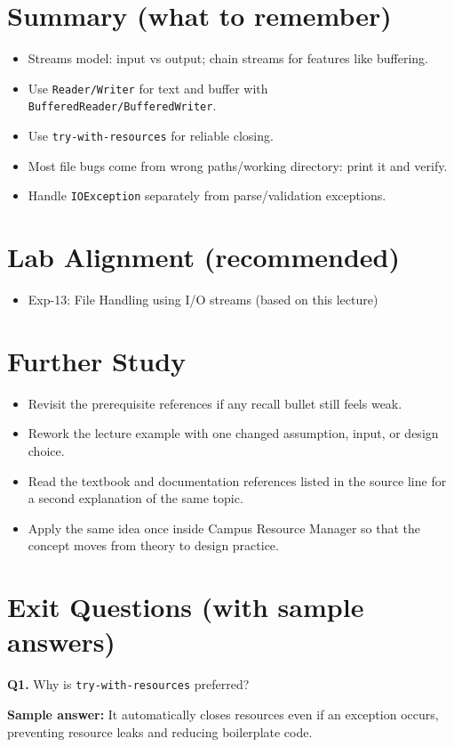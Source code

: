 \documentclass[11pt]{article}
\begin{document}
\section{Summary (what to remember)}
\begin{itemize}
  \item Streams model: input vs output; chain streams for features like buffering.
  \item Use \texttt{Reader/Writer} for text and buffer with \texttt{BufferedReader/BufferedWriter}.
  \item Use \texttt{try-with-resources} for reliable closing.
  \item Most file bugs come from wrong paths/working directory: print it and verify.
  \item Handle \texttt{IOException} separately from parse/validation exceptions.
\end{itemize}

\section{Lab Alignment (recommended)}
\begin{itemize}
  \item Exp-13: File Handling using I/O streams (based on this lecture)
\end{itemize}

\section{Further Study}
\begin{itemize}
  \item Revisit the prerequisite references if any recall bullet still feels weak.
  \item Rework the lecture example with one changed assumption, input, or design choice.
  \item Read the textbook and documentation references listed in the source line for a second explanation of the same topic.
  \item Apply the same idea once inside Campus Resource Manager so that the concept moves from theory to design practice.
\end{itemize}
\notesources{\OOPSUnitIIISources}

\section{Exit Questions (with sample answers)}
\textbf{Q1.} Why is \texttt{try-with-resources} preferred?\par
\textbf{Sample answer:} It automatically closes resources even if an exception occurs, preventing resource leaks and reducing boilerplate code.
\end{document}
